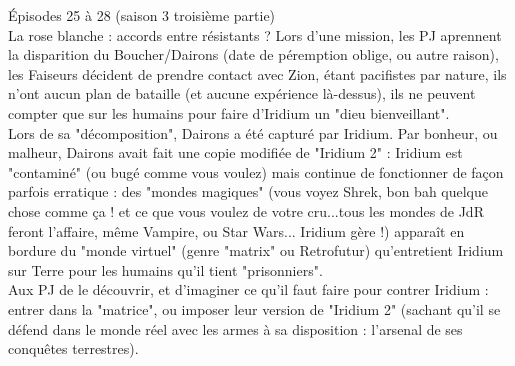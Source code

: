 \documentclass[11pt,twoside,a4paper]{book}
\begin{document}
{\'E}pisodes 25 {\`a} 28 (saison 3 troisi{\`e}me partie) ~\\
La rose blanche : accords entre r{\'e}sistants ? Lors d'une mission, les PJ aprennent la disparition du Boucher/Dairons (date de p{\'e}remption oblige, ou autre raison), les Faiseurs d{\'e}cident de prendre contact avec Zion, {\'e}tant pacifistes par nature, ils n'ont aucun plan de bataille (et aucune exp{\'e}rience l{\`a}-dessus), ils ne peuvent compter que sur les humains pour faire d'Iridium un "dieu bienveillant". ~\\
Lors de sa "d{\'e}composition", Dairons a {\'e}t{\'e} captur{\'e} par Iridium. Par bonheur, ou malheur, Dairons avait fait une copie modifi{\'e}e de "Iridium 2" : Iridium est "contamin{\'e}" (ou bug{\'e} comme vous voulez) mais continue de fonctionner de fa\c{c}on parfois erratique : des "mondes magiques" (vous voyez Shrek, bon bah quelque chose comme \c{c}a ! et ce que vous voulez de votre cru...tous les mondes de JdR feront l'affaire, m{\^e}me Vampire, ou Star Wars... Iridium g{\`e}re !) appara{\^i}t en bordure du "monde virtuel" (genre "matrix" ou Retrofutur) qu'entretient Iridium sur Terre pour les humains qu'il tient "prisonniers". ~\\
Aux PJ de le d{\'e}couvrir, et d'imaginer ce qu'il faut faire pour contrer Iridium : entrer dans la "matrice", ou imposer leur version de "Iridium 2" (sachant qu'il se d{\'e}fend dans le monde r{\'e}el avec les armes {\`a} sa disposition : l'arsenal de ses conqu{\^e}tes terrestres). ~\\
\end{document}
